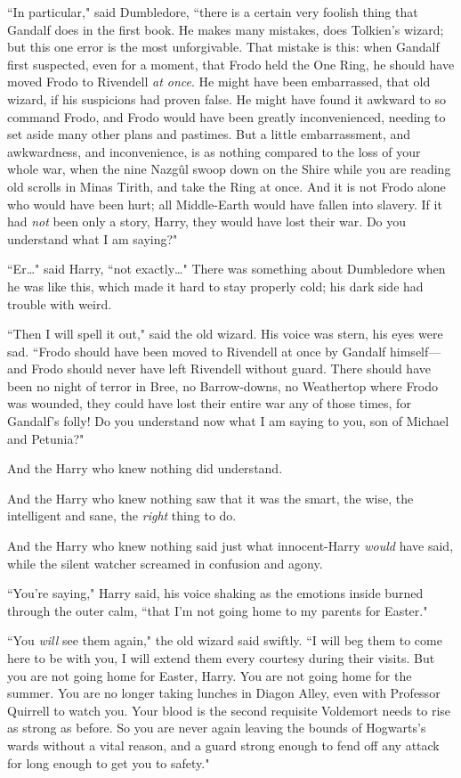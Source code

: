 ``In particular," said Dumbledore, ``there is a certain very foolish thing that Gandalf does in the first book. He makes many mistakes, does Tolkien's wizard; but this one error is the most unforgivable. That mistake is this: when Gandalf first suspected, even for a moment, that Frodo held the One Ring, he should have moved Frodo to Rivendell \emph{at once}. He might have been embarrassed, that old wizard, if his suspicions had proven false. He might have found it awkward to so command Frodo, and Frodo would have been greatly inconvenienced, needing to set aside many other plans and pastimes. But a little embarrassment, and awkwardness, and inconvenience, is as nothing compared to the loss of your whole war, when the nine Nazgûl swoop down on the Shire while you are reading old scrolls in Minas Tirith, and take the Ring at once. And it is not Frodo alone who would have been hurt; all Middle-Earth would have fallen into slavery. If it had \emph{not} been only a story, Harry, they would have lost their war. Do you understand what I am saying?"

``Er{\ldots}" said Harry, ``not exactly{\ldots}" There was something about Dumbledore when he was like this, which made it hard to stay properly cold; his dark side had trouble with weird.

``Then I will spell it out," said the old wizard. His voice was stern, his eyes were sad. ``Frodo should have been moved to Rivendell at once by Gandalf himself---and Frodo should never have left Rivendell without guard. There should have been no night of terror in Bree, no Barrow-downs, no Weathertop where Frodo was wounded, they could have lost their entire war any of those times, for Gandalf's folly! Do you understand now what I am saying to you, son of Michael and Petunia?"

And the Harry who knew nothing did understand.

And the Harry who knew nothing saw that it was the smart, the wise, the intelligent and sane, the \emph{right} thing to do.

And the Harry who knew nothing said just what innocent-Harry \emph{would} have said, while the silent watcher screamed in confusion and agony.

``You're saying," Harry said, his voice shaking as the emotions inside burned through the outer calm, ``that I'm not going home to my parents for Easter."

``You \emph{will} see them again," the old wizard said swiftly. ``I will beg them to come here to be with you, I will extend them every courtesy during their visits. But you are not going home for Easter, Harry. You are not going home for the summer. You are no longer taking lunches in Diagon Alley, even with Professor Quirrell to watch you. Your blood is the second requisite Voldemort needs to rise as strong as before. So you are never again leaving the bounds of Hogwarts's wards without a vital reason, and a guard strong enough to fend off any attack for long enough to get you to safety."


